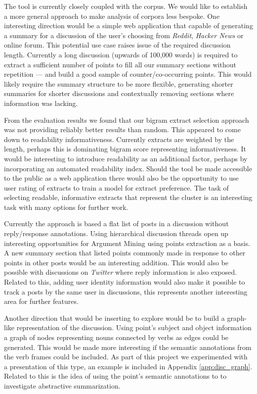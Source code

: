     The tool is currently closely coupled with the corpus. We would like to establish a more general approach to make analysis of corpora less bespoke. One interesting direction would be a simple web application that capable of generating a summary for a discussion of the user's choosing from \textit{Reddit}, \textit{Hacker News} or online forum. This potential use case raises issue of the required discussion length. Currently a long discussion (upwards of 100,000 words) is required to extract a sufficient number of points to fill all our summary sections without repetition --- and build a good sample of counter/co-occurring points. This would likely require the summary structure to be more flexible, generating shorter summaries for shorter discussions and contextually removing sections where information was lacking.

    From the evaluation results we found that our bigram extract selection approach was not providing reliably better results than random. This appeared to come down to readability informativeness. Currently extracts are weighted by the length, perhaps this is dominating bigram score representing informativeness. It would be interesting to introduce readability as an additional factor, perhaps by incorporating an automated readability index. Should the tool be made accessible to the public as a web application there would also be the opportunity to use user rating of extracts to train a model for extract preference. The task of selecting readable, informative extracts that represent the cluster is an interesting task with many options for further work.

    Currently the approach is based a flat list of posts in a discussion without reply/response annotations. Using hierarchical discussion threads open up interesting opportunities for Argument Mining using points extraction as a basis. A new summary section that listed points commonly made in response to other points in other posts would be an interesting addition. This would also be possible with discussions on \textit{Twitter} where reply information is also exposed. Related to this, adding user identity information would also make it possible to track a posts by the same user in discussions, this represents another interesting area for further features.

    Another direction that would be inserting to explore would be to build a graph-like representation of the discussion. Using point's subject and object information a graph of nodes representing nouns connected by verbs as edges could be generated. This would be made more interesting if the semantic annotations from the verb frames could be included. As part of this project we experimented with a presentation of this type, an example is included in Appendix \ref{app:disc_graph}. Related to this is the idea of using the point's semantic annotations to to investigate abstractive summarization.

